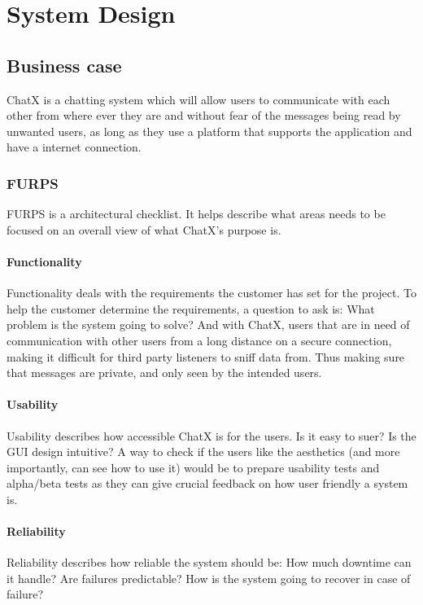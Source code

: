 \chapter{System Design}

\section{Business case}

ChatX is a chatting system which will allow users to communicate with each other from where ever they are and without fear of the messages being read by unwanted users, as long as they use a platform that supports the application and have a internet connection.

\subsection{FURPS}
FURPS is a architectural checklist. It helps describe what areas needs to be focused on an overall view of what ChatX's purpose is.

\subsubsection{Functionality}
Functionality deals with the requirements the customer has set for the project. To help the customer determine the requirements, a question to ask is: What problem is the system going to solve? And with ChatX, users that are in need of communication with other users from a long distance on a secure connection, making it difficult for third party listeners to sniff data from. Thus making sure that messages are private, and only seen by the intended users.

\subsubsection{Usability}
Usability describes how accessible ChatX is for the users. Is it easy to suer? Is the GUI design intuitive? A way to check if the users like the aesthetics (and more importantly, can see how to use it) would be to prepare usability tests and alpha/beta tests as they can give crucial feedback on how user friendly a system is.

\subsubsection{Reliability} 
Reliability describes how reliable the system should be: How much downtime can it handle? Are failures predictable? How is the system going to recover in case of failure? 


